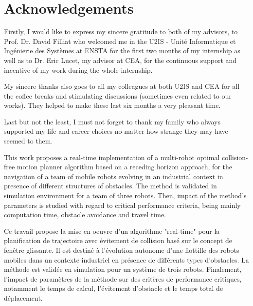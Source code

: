 \documentclass[12pt]{book}
\numberwithin{equation}{section}
\newenvironment{abstractpage}
  {\cleardoublepage\vspace*{\fill}\thispagestyle{empty}}
  {\vfill\cleardoublepage}
\newenvironment{Abstract}[1]
  {\bigskip\selectlanguage{#1}%
   \begin{center}\bfseries\abstractname\end{center}}
  {\par\bigskip}
\begin{document}
\onehalfspace
\frontmatter

\pagestyle{fancy}
\fancyhead{}
\fancyhead[RE,LO]{\leftmark} %
\fancyfoot{}
\fancyfoot[OR,EL]{\thepage}

\let\savecleardoublepage\cleardoublepage
\let\cleardoublepage\clearpage
\chapter*{Acknowledgements}

Firstly, I would like to express my sincere gratitude to both of my advisors, to Prof. Dr. David Filliat who welcomed me in the U2IS - Unité Informatique et Ingénierie des Systèmes at ENSTA for the first two months of my internship as well as to Dr. Eric Lucet, my advisor at CEA, for the continuous support and incentive of my work during the whole internship.

My sincere thanks also goes to all my colleagues at both U2IS and CEA for all the coffee breaks and stimulating discussions (sometimes even related to our works). They helped to make these last six months a very pleasant time.

Last but not the least, I must not forget to thank my family who always supported my life and career choices no matter how strange they may have seemed to them.

\begin{abstractpage}
\thispagestyle{empty}
\begin{Abstract}{english}

This work proposes a real-time implementation of a multi-robot optimal collision-free motion planner algorithm based on a receding horizon approach, for the navigation of a team of mobile robots evolving in an industrial context in presence of different structures of obstacles. The method is validated in simulation environment for a team of three robots. Then, impact of the method's parameters is studied with regard to critical performance criteria, being mainly computation time, obstacle avoidance and travel time.

\end{Abstract}
\begin{Abstract}{french}

Ce travail propose la mise en oeuvre d'un algorithme "real-time" pour la planification de trajectoire avec évitement de collision basé sur le concept de fenêtre glissante. Il est destiné à l'évolution autonome d'une flottille des robots mobiles dans un contexte industriel en présence de différents types d'obstacles. La méthode est validée en simulation pour un système de trois robots. Finalement, l'impact de paramètres de la méthode sur des critères de performance critiques, notamment le temps de calcul, l'évitement d'obstacle et le temps total de déplacement.

\end{Abstract}
\end{abstractpage}
\let\cleardoublepage\savecleardoublepage
\end{document}
